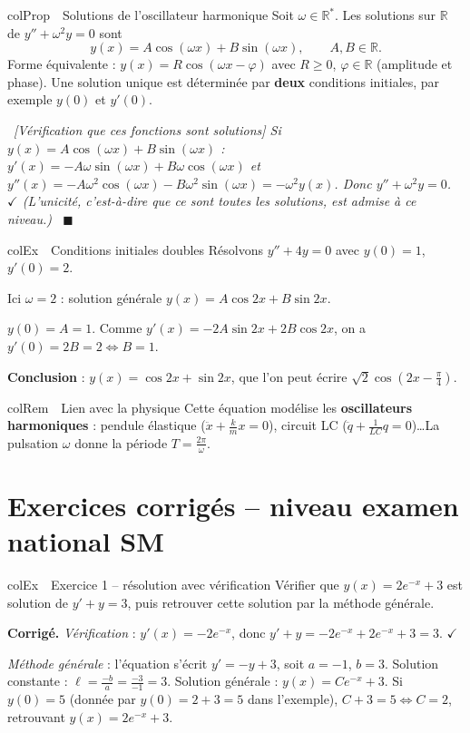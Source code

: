 \documentclass[11pt,a4paper]{article}
\newenvironment{propriete}[1][Propriété]
  {\begin{fiche}{colProp}{\ding{72}~~#1}}{\end{fiche}}
\newenvironment{exemple}[1][Exemple]
  {\begin{fiche}{colEx}{\ding{217}~~#1}}{\end{fiche}}
\newenvironment{remarque}[1][Remarque]
  {\begin{fiche}{colRem}{\ding{43}~~#1}}{\end{fiche}}
\newenvironment{demo}
  {\par\smallskip\noindent{\sffamily\bfseries\color{qtealdark}Démonstration.}\ \itshape}
  {\ \normalfont\hfill$\blacksquare$\par\medskip}
\begin{document}
\begin{propriete}[Solutions de l'oscillateur harmonique]
Soit $\omega\in\mathbb{R}^*$. Les solutions sur $\mathbb{R}$ de $y''+\omega^2y=0$ sont
\[
  y(x) = A\cos(\omega x)+B\sin(\omega x), \qquad A,B\in\mathbb{R}.
\]
Forme équivalente : $y(x)=R\cos(\omega x-\varphi)$ avec $R\geq0$, $\varphi\in\mathbb{R}$ (amplitude et phase). Une solution unique est déterminée par \textbf{deux} conditions initiales, par exemple $y(0)$ et $y'(0)$.
\end{propriete}

\begin{demo}[Vérification que ces fonctions sont solutions]
Si $y(x)=A\cos(\omega x)+B\sin(\omega x)$ : $y'(x)=-A\omega\sin(\omega x)+B\omega\cos(\omega x)$ et $y''(x)=-A\omega^2\cos(\omega x)-B\omega^2\sin(\omega x)=-\omega^2y(x)$. Donc $y''+\omega^2y=0$. $\checkmark$ (L'unicité, c'est-à-dire que ce sont \emph{toutes} les solutions, est admise à ce niveau.)
\end{demo}

\begin{exemple}[Conditions initiales doubles]
Résolvons $y''+4y=0$ avec $y(0)=1$, $y'(0)=2$.

\smallskip
Ici $\omega=2$ : solution générale $y(x)=A\cos2x+B\sin2x$.

\smallskip
$y(0)=A=1$. Comme $y'(x)=-2A\sin2x+2B\cos2x$, on a $y'(0)=2B=2\iff B=1$.

\smallskip
\textbf{Conclusion} : $y(x)=\cos2x+\sin2x$, que l'on peut écrire $\sqrt2\cos\left(2x-\frac\pi4\right)$.
\end{exemple}

\begin{remarque}[Lien avec la physique]
Cette équation modélise les \textbf{oscillateurs harmoniques} : pendule élastique ($\ddot x+\frac km x=0$), circuit LC ($\ddot q+\frac1{LC}q=0$)\ldots La pulsation $\omega$ donne la période $T=\frac{2\pi}{\omega}$.
\end{remarque}

\section{Exercices corrigés -- niveau examen national SM}

\begin{exemple}[Exercice 1 -- résolution avec vérification]
Vérifier que $y(x)=2e^{-x}+3$ est solution de $y'+y=3$, puis retrouver cette solution par la méthode générale.

\smallskip
\textbf{Corrigé.} \emph{Vérification} : $y'(x)=-2e^{-x}$, donc $y'+y=-2e^{-x}+2e^{-x}+3=3$. $\checkmark$

\smallskip
\emph{Méthode générale} : l'équation s'écrit $y'=-y+3$, soit $a=-1$, $b=3$. Solution constante : $\ell=\frac{-b}{a}=\frac{-3}{-1}=3$. Solution générale : $y(x)=Ce^{-x}+3$. Si $y(0)=5$ (donnée par $y(0)=2+3=5$ dans l'exemple), $C+3=5\iff C=2$, retrouvant $y(x)=2e^{-x}+3$.
\end{exemple}
\end{document}
